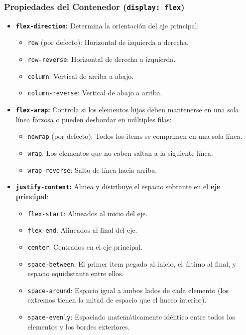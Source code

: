 \subsubsection{Propiedades del Contenedor (\texttt{display: flex})}
\begin{itemize}[leftmargin=1.2cm]
  \item \textbf{\texttt{flex-direction}:} Determina la orientación del eje principal:
    \begin{itemize}
      \item \texttt{row} (por defecto): Horizontal de izquierda a derecha.
      \item \texttt{row-reverse}: Horizontal de derecha a izquierda.
      \item \texttt{column}: Vertical de arriba a abajo.
      \item \texttt{column-reverse}: Vertical de abajo a arriba.
    \end{itemize}
  \item \textbf{\texttt{flex-wrap}:} Controla si los elementos hijos deben mantenerse en una sola línea forzosa o pueden desbordar en múltiples filas:
    \begin{itemize}
      \item \texttt{nowrap} (por defecto): Todos los items se comprimen en una sola línea.
      \item \texttt{wrap}: Los elementos que no caben saltan a la siguiente línea.
      \item \texttt{wrap-reverse}: Salto de línea hacia arriba.
    \end{itemize}
  \item \textbf{\texttt{justify-content}:} Alinea y distribuye el espacio sobrante en el \textbf{eje principal}:
    \begin{itemize}
      \item \texttt{flex-start}: Alineados al inicio del eje.
      \item \texttt{flex-end}: Alineados al final del eje.
      \item \texttt{center}: Centrados en el eje principal.
      \item \texttt{space-between}: El primer item pegado al inicio, el último al final, y espacio equidistante entre ellos.
      \item \texttt{space-around}: Espacio igual a ambos lados de cada elemento (los extremos tienen la mitad de espacio que el hueco interior).
      \item \texttt{space-evenly}: Espaciado matemáticamente idéntico entre todos los elementos y los bordes exteriores.

\end{itemize}
\end{itemize}
